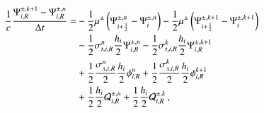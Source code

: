 \documentclass[preprint,12pt]{elsarticle}
\begin{document}
\begin{equation}\lequ{S2CNfullR}\begin{split}
  \frac{1}{c}\frac{\Psi\iR^{\pm,k+1}-\Psi\iR^{\pm,n}}{\dt} = &
  -\half\mu^\pm\fn{\Psi^{\pm,n}_{i+\half} - \Psi^{\pm,n}_i}
  -\half\mu^\pm\fn{\Psi^{\pm,k+1}_{i+\half} - \Psi^{\pm,k+1}_i}\\
  &-\half\sigma_{t,i,R}^n\frac{h_i}{2}\Psi\iR^{\pm,n}
   -\half\sigma_{t,i,R}^k\frac{h_i}{2}\Psi\iR^{\pm,k+1}\\
  &+\half\frac{\sigma_{s,i,R}^n}{2}\frac{h_i}{2}\phi\iR^n
   +\half\frac{\sigma_{s,i,R}^k}{2}\frac{h_i}{2}\phi\iR^{k+1}\\
  &+\half\frac{h_i}{2}\Q_{i,R}^{\pm,n}
   +\half\frac{h_i}{2}\Q_{i,R}^{\pm,k} \pec
\end{split}\end{equation}
\end{document}
